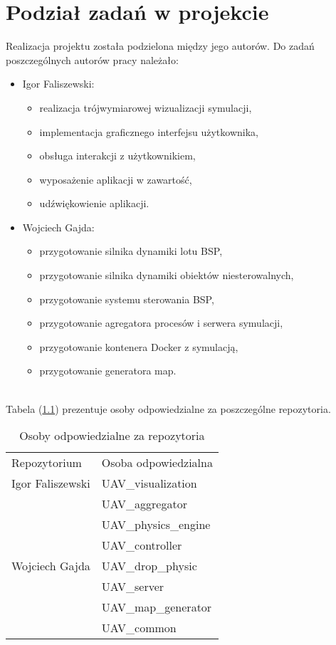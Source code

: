 \chapter{Podział zadań w projekcie}

Realizacja projektu została podzielona między jego autorów. Do zadań poszczególnych autorów pracy należało:\\

\begin{itemize}[noitemsep,nolistsep]
	\item Igor Faliszewski:
	\begin{itemize}[noitemsep,nolistsep]
		\item realizacja trójwymiarowej wizualizacji symulacji,
		\item implementacja graficznego interfejsu użytkownika,
		\item obsługa interakcji z użytkownikiem,
		\item wyposażenie aplikacji w zawartość,
		\item udźwiękowienie aplikacji.
	\end{itemize}
	\item Wojciech Gajda:
	\begin{itemize}[noitemsep,nolistsep]
		\item przygotowanie silnika dynamiki lotu BSP,
		\item przygotowanie silnika dynamiki obiektów niesterowalnych,
		\item przygotowanie systemu sterowania BSP,
		\item przygotowanie agregatora procesów i serwera symulacji,
		\item przygotowanie kontenera Docker z symulacją,
		\item przygotowanie generatora map.
	\end{itemize}
\end{itemize}
\ \\
Tabela (\ref{rep_rep}) prezentuje osoby odpowiedzialne za poszczególne repozytoria.

\renewcommand{\arraystretch}{1.1}
\begin{table}[!h]
	\centering
	\begin{tabular}{|m{}|m{}|} 
		\hline
		\rowcolor{Gray}
		Repozytorium &  Osoba odpowiedzialna \\
		\multirow{1}{12em}{Igor Faliszewski} 
		& UAV\_visualization \\
		\hline
		\multirow{7}{12em}{{Wojciech Gajda}} 
		& UAV\_aggregator \\
		& UAV\_physics\_engine\\
		& UAV\_controller \\
		& UAV\_drop\_physic \\
		& UAV\_server \\
		& UAV\_map\_generator \\
		& UAV\_common \\
		\hline
	\end{tabular}
	\caption{Osoby odpowiedzialne za repozytoria}
	\label{rep_rep}
\end{table}